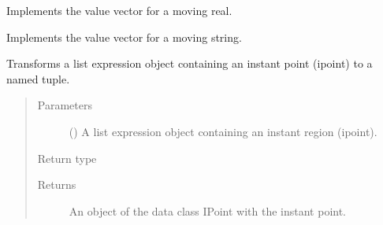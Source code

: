 \documentclass[letterpaper,10pt,english]{sphinxmanual}
\begin{document}

\begin{fulllineitems}
\label{\detokenize{index:secondodb.api.algebras.secondospatiotemporalalgebra.ValueVectorReal}}
Implements the value vector for a moving real.

\end{fulllineitems}


\begin{fulllineitems}
\label{\detokenize{index:secondodb.api.algebras.secondospatiotemporalalgebra.ValueVectorString}}
Implements the value vector for a moving string.

\end{fulllineitems}


\begin{fulllineitems}
\label{\detokenize{index:secondodb.api.algebras.secondospatiotemporalalgebra.parse_ipoint}}
Transforms a list expression object containing an instant point (ipoint) to a named tuple.
\begin{quote}\begin{description}
\item[{Parameters}] \leavevmode
{} () \textendash{} A list expression object containing an instant region (ipoint).

\item[{Return type}] \leavevmode
{\hyperref[\detokenize{index:secondodb.api.algebras.secondospatiotemporalalgebra.IPoint}]{}}

\item[{Returns}] \leavevmode
An object of the data class IPoint with the instant point.

\end{description}\end{quote}

\end{fulllineitems}
\end{document}
